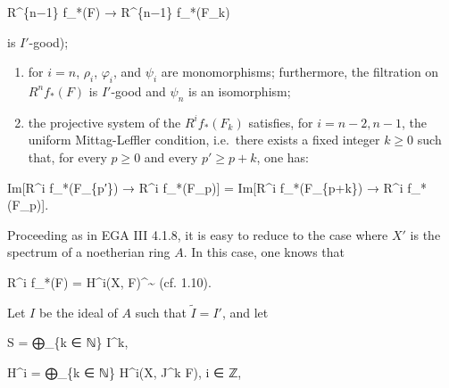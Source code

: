 \documentclass[
]{article}
\newenvironment{Shaded}{}{}
\newcommand{\NormalTok}[1]{#1}
\begin{document}
\begin{Shaded}
\begin{Highlighting}[]
\NormalTok{R\^{}\{n−1\} f\_*(F) → R\^{}\{n−1\} f\_*(F\_k)}
\end{Highlighting}
\end{Shaded}

is \(I'\)-good);

\begin{enumerate}
\def\labelenumi{(\arabic{enumi})}
\setcounter{enumi}{1}
\item
  for \(i = n\), \(\rho_{i}\), \(\varphi_{i}\), and \(\psi_{i}\) are
  monomorphisms; furthermore, the filtration on \(R^{n} f_{*}(F)\) is
  \(I'\)-good and \(\psi_{n}\) is an isomorphism;
\item
  the projective system of the \(R^{i} f_{*}(F_{k})\) satisfies, for
  \(i = n - 2, n - 1\), the uniform Mittag-Leffler condition, i.e.~there
  exists a fixed integer \(k \geqslant 0\) such that, for every
  \(p \geqslant 0\) and every \(p' \geqslant p + k\), one has:
\end{enumerate}

\begin{Shaded}
\begin{Highlighting}[]
\NormalTok{Im[R\^{}i f\_*(F\_\{p′\}) → R\^{}i f\_*(F\_p)] = Im[R\^{}i f\_*(F\_\{p+k\}) → R\^{}i f\_*(F\_p)].}
\end{Highlighting}
\end{Shaded}

Proceeding as in EGA III 4.1.8, it is easy to reduce to the case where
\(X'\) is the spectrum of a noetherian ring \(A\). In this case, one
knows that

\begin{Shaded}
\begin{Highlighting}[]
\NormalTok{R\^{}i f\_*(F) = H\^{}i(X, F)\^{}\textasciitilde{}     (cf. 1.10).}
\end{Highlighting}
\end{Shaded}

Let \(I\) be the ideal of \(A\) such that \(\tilde{I} = I'\), and let

\begin{Shaded}
\begin{Highlighting}[]
\NormalTok{S = ⨁\_\{k ∈ ℕ\} I\^{}k,}
\end{Highlighting}
\end{Shaded}

\begin{Shaded}
\begin{Highlighting}[]
\NormalTok{H\^{}i = ⨁\_\{k ∈ ℕ\} H\^{}i(X, J\^{}k F),    i ∈ ℤ,}
\end{Highlighting}
\end{Shaded}
\end{document}
